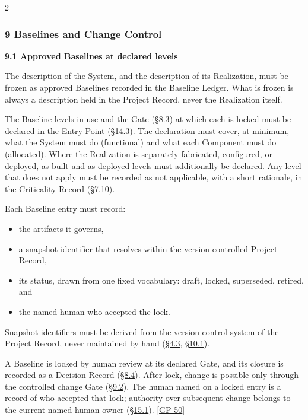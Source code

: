 \begin{multicols}{2}
\hypertarget{nss-9}{}

\subsubsection*{9 Baselines and Change Control}

\hypertarget{nss-9.1}{}

\par\smallskip\noindent\textbf{9.1 Approved Baselines at declared levels}\par\nopagebreak

The description of the System, and the description of its Realization, must be frozen as approved Baselines recorded in the Baseline Ledger. What is frozen is always a description held in the Project Record, never the Realization itself.

The Baseline levels in use and the Gate (\hyperlink{nss-8.3}{\S8.3}) at which each is locked must be declared in the Entry Point (\hyperlink{nss-14.3}{\S14.3}). The declaration must cover, at minimum, what the System must do (functional) and what each Component must do (allocated). Where the Realization is separately fabricated, configured, or deployed, as-built and as-deployed levels must additionally be declared. Any level that does not apply must be recorded as not applicable, with a short rationale, in the Criticality Record (\hyperlink{nss-7.10}{\S7.10}).

Each Baseline entry must record:

\begin{itemize}\setlength{\itemsep}{0pt}\setlength{\parskip}{0pt}

\item the artifacts it governs,

\item a snapshot identifier that resolves within the version-controlled Project Record,

\item its status, drawn from one fixed vocabulary: draft, locked, superseded, retired, and

\item the named human who accepted the lock.

\end{itemize}

Snapshot identifiers must be derived from the version control system of the Project Record, never maintained by hand (\hyperlink{nss-4.3}{\S4.3}, \hyperlink{nss-10.1}{\S10.1}).

A Baseline is locked by human review at its declared Gate, and its closure is recorded as a Decision Record (\hyperlink{nss-8.4}{\S8.4}). After lock, change is possible only through the controlled change Gate (\hyperlink{nss-9.2}{\S9.2}). The human named on a locked entry is a record of who accepted that lock; authority over subsequent change belongs to the current named human owner (\hyperlink{nss-15.1}{\S15.1}). [\hyperlink{gp-50}{GP-50}]


\end{multicols}

